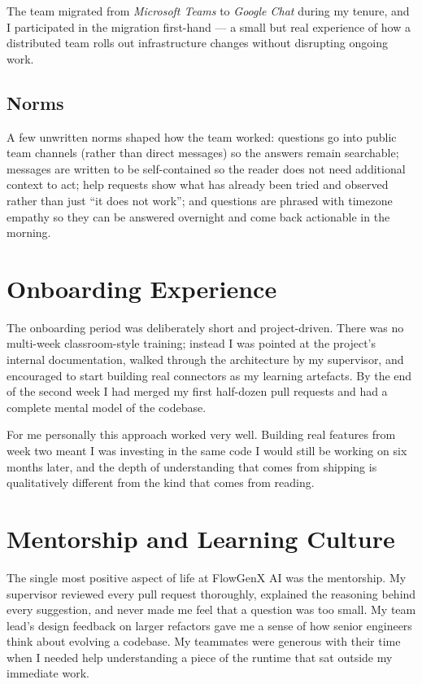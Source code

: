 The team migrated from \emph{Microsoft Teams} to \emph{Google Chat}
during my tenure, and I participated in the migration first-hand ---
a small but real experience of how a distributed team rolls out
infrastructure changes without disrupting ongoing work.

\subsection{Norms}
A few unwritten norms shaped how the team worked: questions go into
public team channels (rather than direct messages) so the answers
remain searchable; messages are written to be self-contained so the
reader does not need additional context to act; help requests show
what has already been tried and observed rather than just ``it does
not work''; and questions are phrased with timezone empathy so they
can be answered overnight and come back actionable in the morning.

\section{Onboarding Experience}
The onboarding period was deliberately short and project-driven.
There was no multi-week classroom-style training; instead I was
pointed at the project's internal documentation, walked through the
architecture by my supervisor, and
encouraged to start building real connectors as my learning
artefacts. By the end of the second week I had merged my first
half-dozen pull requests and had a complete mental model of the
codebase.

For me personally this approach worked very well. Building real
features from week two meant I was investing in the same code I
would still be working on six months later, and the depth of
understanding that comes from shipping is qualitatively different
from the kind that comes from reading.

\section{Mentorship and Learning Culture}
The single most positive aspect of life at FlowGenX AI was the
mentorship. My supervisor reviewed every pull request thoroughly,
explained the reasoning behind every suggestion, and never made me
feel that a question was too small. My team lead's design feedback
on larger refactors gave me a sense of how senior engineers think
about evolving a codebase. My teammates were generous with their
time when I needed help understanding a piece of the runtime that
sat outside my immediate work.

